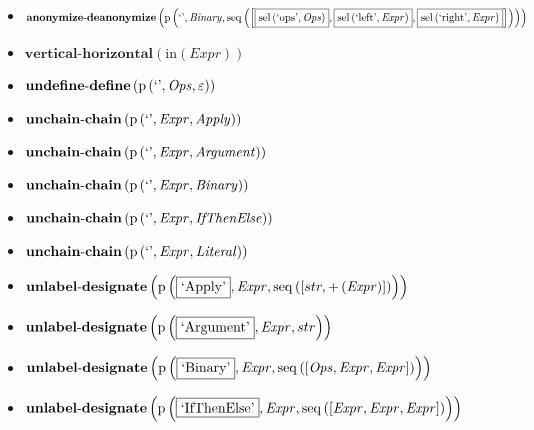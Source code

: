 {\begin{itemize}
\item $\mathbf{anonymize\text{-}deanonymize}\\\left(\mathrm{p}\left(\text{`'},\mathit{Binary},\mathrm{seq}\left(\left[\fbox{$\mathrm{sel}\left(\text{`ops'},\mathit{Ops}\right)$}, \fbox{$\mathrm{sel}\left(\text{`left'},\mathit{Expr}\right)$}, \fbox{$\mathrm{sel}\left(\text{`right'},\mathit{Expr}\right)$}\right]\right)\right)\right)$
\item $\mathbf{vertical\text{-}horizontal}\left(\mathrm{in}(Expr)\right)$
\item $\mathbf{undefine\text{-}define}\\\left(\mathrm{p}\left(\text{`'},\mathit{Ops},\varepsilon\right)\right)$
\item $\mathbf{unchain\text{-}chain}\\\left(\mathrm{p}\left(\text{`'},\mathit{Expr},\mathit{Apply}\right)\right)$
\item $\mathbf{unchain\text{-}chain}\\\left(\mathrm{p}\left(\text{`'},\mathit{Expr},\mathit{Argument}\right)\right)$
\item $\mathbf{unchain\text{-}chain}\\\left(\mathrm{p}\left(\text{`'},\mathit{Expr},\mathit{Binary}\right)\right)$
\item $\mathbf{unchain\text{-}chain}\\\left(\mathrm{p}\left(\text{`'},\mathit{Expr},\mathit{IfThenElse}\right)\right)$
\item $\mathbf{unchain\text{-}chain}\\\left(\mathrm{p}\left(\text{`'},\mathit{Expr},\mathit{Literal}\right)\right)$
\item $\mathbf{unlabel\text{-}designate}\\\left(\mathrm{p}\left(\fbox{\text{`Apply'}},\mathit{Expr},\mathrm{seq}\left(\left[str, {+}\left(\mathit{Expr}\right)\right]\right)\right)\right)$
\item $\mathbf{unlabel\text{-}designate}\\\left(\mathrm{p}\left(\fbox{\text{`Argument'}},\mathit{Expr},str\right)\right)$
\item $\mathbf{unlabel\text{-}designate}\\\left(\mathrm{p}\left(\fbox{\text{`Binary'}},\mathit{Expr},\mathrm{seq}\left(\left[\mathit{Ops}, \mathit{Expr}, \mathit{Expr}\right]\right)\right)\right)$
\item $\mathbf{unlabel\text{-}designate}\\\left(\mathrm{p}\left(\fbox{\text{`IfThenElse'}},\mathit{Expr},\mathrm{seq}\left(\left[\mathit{Expr}, \mathit{Expr}, \mathit{Expr}\right]\right)\right)\right)$

\end{itemize}}
